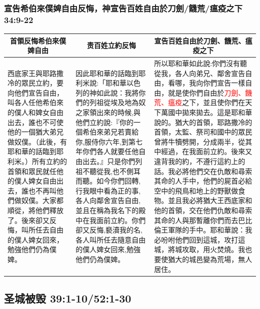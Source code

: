 \subsubsection{宣告希伯來僕婢自由反悔，神宣告百姓自由於刀劍/饑荒/瘟疫之下 34:9-22}
\begin{table}[H]
\centering
\begin{tabular}{p{3.75cm}|p{5.0cm}|p{7.70cm}}\hline\hline
\multicolumn{1}{c|}{首領反悔希伯來僕婢自由}&\multicolumn{1}{c|}{责百姓立約反悔}&\multicolumn{1}{c}{宣告百姓自由於刀劍、饑荒、瘟疫之下}\\\hline
\multirow{1}{3.95cm}{西底家王與耶路撒冷的眾民立約，要向他們宣告自由，叫各人任他希伯來的僕人和婢女自由出去，誰也不可使他的一個猶大弟兄做奴僕。（此後，有耶和華的話臨到耶利米。）所有立約的首領和眾民就任他的僕人婢女自由出去，誰也不再叫他們做奴僕。大家都順從，將他們釋放了。後來卻又反悔，叫所任去自由的僕人婢女回來，勉強他們仍為僕婢。}
&因此耶和華的話臨到耶利米說:「耶和華以色列的神如此說：我將你們的列祖從埃及地為奴之家領出來的時候,與他們立約說:『你的一個希伯來弟兄若賣給你,服侍你六年,到第七年你們各人就要任他自由出去。』只是你們列祖不聽從我,也不側耳而聽。如今你們回轉,行我眼中看為正的事,各人向鄰舍宣告自由,並且在稱為我名下的殿中在我面前立約。你們卻又反悔,褻瀆我的名,各人叫所任去隨意自由的僕人婢女回來,勉強他們仍為僕婢。
&所以耶和華如此說:你們沒有聽從我，各人向弟兄、鄰舍宣告自由，看哪，我向你們宣告一樣自由，就是使你們自由於\textcolor{red}{刀劍、饑荒、瘟疫}之下，並且使你們在天下萬國中拋來拋去。這是耶和華說的。猶大的首領，耶路撒冷的首領，太監、祭司和國中的眾民曾將牛犢劈開，分成兩半，從其中經過，在我面前立約。後來又違背我的約，不遵行這約上的話。我必將他們交在仇敵和尋索其命的人手中，他們的屍首必給空中的飛鳥和地上的野獸做食物。並且我必將猶大王西底家和他的首領，交在他們仇敵和尋索其命的人與那暫離你們而去巴比倫王軍隊的手中。耶和華說：我必吩咐他們回到這城，攻打這城，將城攻取，用火焚燒。我也要使猶大的城邑變為荒場，無人居住。\\\hline
\end{tabular}
\end{table}

\subsection{圣城被毁 39:1-10/52:1-30}
